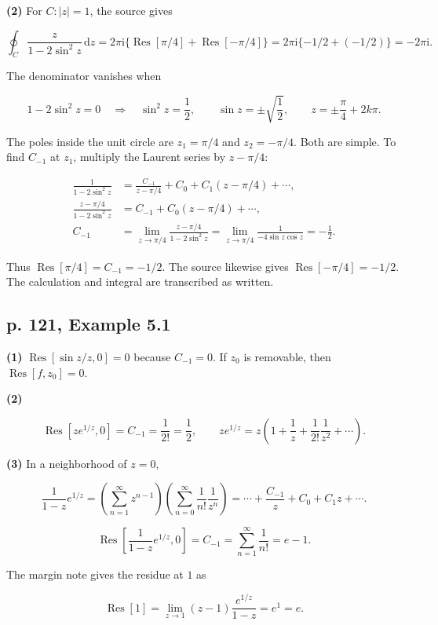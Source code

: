 \documentclass[11pt,a4paper]{article}
\theoremstyle{definition}
\theoremstyle{plain}
\begin{document}
\textbf{(2)} For $C:|z|=1$, the source gives

\[
\oint_C\frac{z}{1-2\sin^2 z}\,\mathrm{d}z
=2\pi \mathrm{i}\{\operatorname{Res}[\pi/4]+\operatorname{Res}[-\pi/4]\}
=2\pi \mathrm{i}\{-1/2+(-1/2)\}=-2\pi \mathrm{i}.
\]

The denominator vanishes when

\[
1-2\sin^2 z=0\quad\Rightarrow\quad\sin^2 z=\frac12,\qquad
\sin z=\pm\sqrt{\frac12},\qquad z=\pm\frac\pi4+2k\pi.
\]

The poles inside the unit circle are $z_1=\pi/4$ and $z_2=-\pi/4$. Both are simple. To find $C_{-1}$ at $z_1$, multiply the Laurent series by $z-\pi/4$:

\[
\begin{aligned}
\frac1{1-2\sin^2 z}&=\frac{C_{-1}}{z-\pi/4}+C_0+C_1(z-\pi/4)+\cdots,\\
\frac{z-\pi/4}{1-2\sin^2 z}&=C_{-1}+C_0(z-\pi/4)+\cdots,\\
C_{-1}&=\lim_{z\to\pi/4}\frac{z-\pi/4}{1-2\sin^2 z}
=\lim_{z\to\pi/4}\frac1{-4\sin z\cos z}=-\frac12.
\end{aligned}
\]

Thus $\operatorname{Res}[\pi/4]=C_{-1}=-1/2$. The source likewise gives $\operatorname{Res}[-\pi/4]=-1/2$. The calculation and integral are transcribed as written.


\subsection{p. 121, Example 5.1}

\textbf{(1)} $\operatorname{Res}[\sin z/z,0]=0$ because $C_{-1}=0$. If $z_0$ is removable, then $\operatorname{Res}[f,z_0]=0$.

\textbf{(2)}

\[
\operatorname{Res}[ze^{1/z},0]=C_{-1}=\frac1{2!}=\frac12,
\qquad ze^{1/z}=z\left(1+\frac1z+\frac1{2!}\frac1{z^2}+\cdots\right).
\]

\textbf{(3)} In a neighborhood of $z=0$,

\[
\frac1{1-z}e^{1/z}
=\left(\sum_{n=1}^{\infty}z^{n-1}\right)
\left(\sum_{n=0}^{\infty}\frac1{n!}\frac1{z^n}\right)
=\cdots+\frac{C_{-1}}z+C_0+C_1z+\cdots.
\]

\[
\operatorname{Res}\left[\frac1{1-z}e^{1/z},0\right]
=C_{-1}=\sum_{n=1}^{\infty}\frac1{n!}=e-1.
\]

The margin note gives the residue at $1$ as

\[
\operatorname{Res}[1]=\lim_{z\to1}(z-1)\frac{e^{1/z}}{1-z}=e^1=e.
\]
\end{document}
